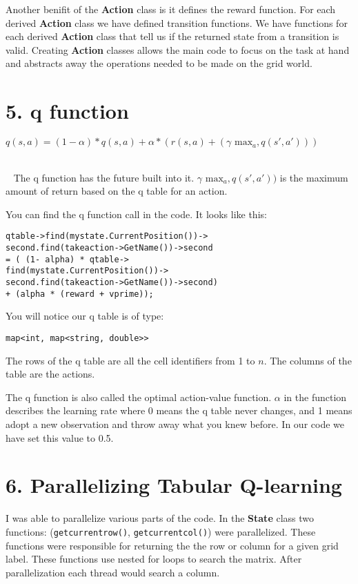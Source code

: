 \documentclass[12pt]{article}
\begin{document}
Another benifit of the \textbf{Action} class is it defines the 
reward function. For each derived \textbf{Action} class we have defined transition functions. We have functions for each derived \textbf{Action} class
that tell us if the returned state from a transition is
valid. Creating \textbf{Action} classes allows the main code 
to focus on the task at hand and abstracts away the operations
needed to be made on the grid world.

\section*{5. q function}

\centerline{$q(s,a) = (1-\alpha) * q(s,a) + \alpha * (r(s,a) + (\gamma \text{ max}_a,q(s',a')))$}

~\\~
The q function has the future built into it. $\gamma \text{ max}_a,q(s',a'))$ is the
maximum amount of return based on the q table for an action.

You can find the q function call in the code. It looks like this:

\begin{verbatim}
qtable->find(mystate.CurrentPosition())->
second.find(takeaction->GetName())->second 
= ( (1- alpha) * qtable->
find(mystate.CurrentPosition())->
second.find(takeaction->GetName())->second) 
+ (alpha * (reward + vprime));
\end{verbatim}

You will notice our q table is of type:
\begin{verbatim}
map<int, map<string, double>>
\end{verbatim}

The rows of the q table are all the cell identifiers from 1 to $n$. 
The columns of the table are the actions. 

The q function is also called the optimal action-value function. $\alpha$ in the
function describes the learning rate where 0 means the q table never changes, and 1 means adopt a new observation 
and throw away what you knew before. In our code we have set this value to 0.5.

\section*{6. Parallelizing Tabular Q-learning}
I was able to parallelize various parts of the code. In the
\textbf{State} class two functions: (\verb|getcurrentrow()|, \verb|getcurrentcol()|) were parallelized. These functions 
were responsible for returning the 
the row or column for a given grid label. These functions use nested for loops to 
search the matrix. After parallelization each thread would search a column. 
\end{document}
